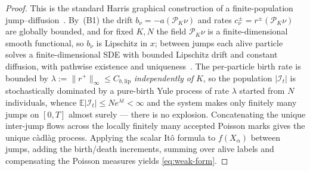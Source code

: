 \documentclass[a4paper,fleqn]{cas-sc}
\theoremstyle{definition}
\theoremstyle{remark}
\begin{document}
\begin{proof}
This is the standard Harris graphical construction of a finite-population
jump--diffusion~\cite{harris1972nearest,harris1978additive,bansaye2015stochastic,fournier2004microscopic}.
By~(B1) the drift $b_\nu=-a(\mathcal P_K\nu)$ and rates $c^\pm_\nu=r^\pm(\mathcal P_K\nu)$ are
globally bounded, and for fixed $K,N$ the field $\mathcal P_K\nu$ is a finite-dimensional smooth
functional, so $b_\nu$ is Lipschitz in $x$; between jumps each alive particle solves a
finite-dimensional SDE with bounded Lipschitz drift and constant diffusion, with pathwise
existence and uniqueness~\cite{ikeda1989stochastic}. The per-particle birth rate is bounded by
$\lambda:=\|r^+\|_\infty\le C_{b,\mathrm{lip}}$ \emph{independently of} $K$, so the population
$|\mathcal I_t|$ is stochastically dominated by a pure-birth Yule process of rate $\lambda$ started
from $N$ individuals, whence $\mathbb E|\mathcal I_t|\le Ne^{\lambda t}<\infty$ and the system makes
only finitely many jumps on $[0,T]$ almost surely --- there is no explosion. Concatenating the
unique inter-jump flows across the locally finitely many accepted Poisson marks gives the unique
c\`adl\`ag process. Applying the scalar It\^o formula to $f(X_\alpha)$ between jumps, adding the
birth/death increments, summing over alive labels and compensating the Poisson measures yields
\eqref{eq:weak-form}.
\end{proof}
\end{document}
